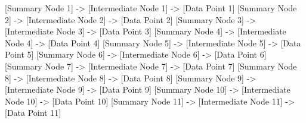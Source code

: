 [Summary Node 1] -> [Intermediate Node 1] -> [Data Point 1]
    [Summary Node 2] -> [Intermediate Node 2] -> [Data Point 2]
    [Summary Node 3] -> [Intermediate Node 3] -> [Data Point 3]
    [Summary Node 4] -> [Intermediate Node 4] -> [Data Point 4]
    [Summary Node 5] -> [Intermediate Node 5] -> [Data Point 5]
    [Summary Node 6] -> [Intermediate Node 6] -> [Data Point 6]
    [Summary Node 7] -> [Intermediate Node 7] -> [Data Point 7]
    [Summary Node 8] -> [Intermediate Node 8] -> [Data Point 8]
    [Summary Node 9] -> [Intermediate Node 9] -> [Data Point 9]
    [Summary Node 10] -> [Intermediate Node 10] -> [Data Point 10]
    [Summary Node 11] -> [Intermediate Node 11] -> [Data Point 11]